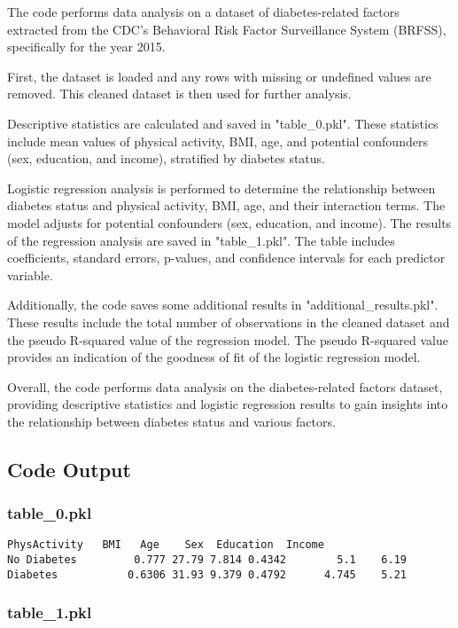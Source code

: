 \documentclass[11pt]{article}
\begin{document}
The code performs data analysis on a dataset of diabetes-related factors extracted from the CDC's Behavioral Risk Factor Surveillance System (BRFSS), specifically for the year 2015.

First, the dataset is loaded and any rows with missing or undefined values are removed. This cleaned dataset is then used for further analysis.

Descriptive statistics are calculated and saved in "table\_0.pkl". These statistics include mean values of physical activity, BMI, age, and potential confounders (sex, education, and income), stratified by diabetes status.

Logistic regression analysis is performed to determine the relationship between diabetes status and physical activity, BMI, age, and their interaction terms. The model adjusts for potential confounders (sex, education, and income). The results of the regression analysis are saved in "table\_1.pkl". The table includes coefficients, standard errors, p-values, and confidence intervals for each predictor variable.

Additionally, the code saves some additional results in "additional\_results.pkl". These results include the total number of observations in the cleaned dataset and the pseudo R-squared value of the regression model. The pseudo R-squared value provides an indication of the goodness of fit of the logistic regression model.

Overall, the code performs data analysis on the diabetes-related factors dataset, providing descriptive statistics and logistic regression results to gain insights into the relationship between diabetes status and various factors.

\subsection{Code Output}

\subsubsection*{table\_0.pkl}

\begin{Verbatim}[tabsize=4]
             PhysActivity   BMI   Age    Sex  Education  Income
No Diabetes         0.777 27.79 7.814 0.4342        5.1    6.19
Diabetes           0.6306 31.93 9.379 0.4792      4.745    5.21
\end{Verbatim}

\subsubsection*{table\_1.pkl}
\end{document}
